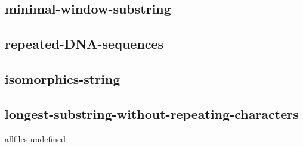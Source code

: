 \documentclass[a4paper,10pt]{article}
\begin{document}
\begin{CJK}{UTF8}{gbsn}
\subsection{minimal-window-substring}


\subsection{repeated-DNA-sequences}


\subsection{isomorphics-string}


\subsection{longest-substring-without-repeating-characters}


\fi

\ifx allfiles undefined
\end{CJK}
\end{document}
